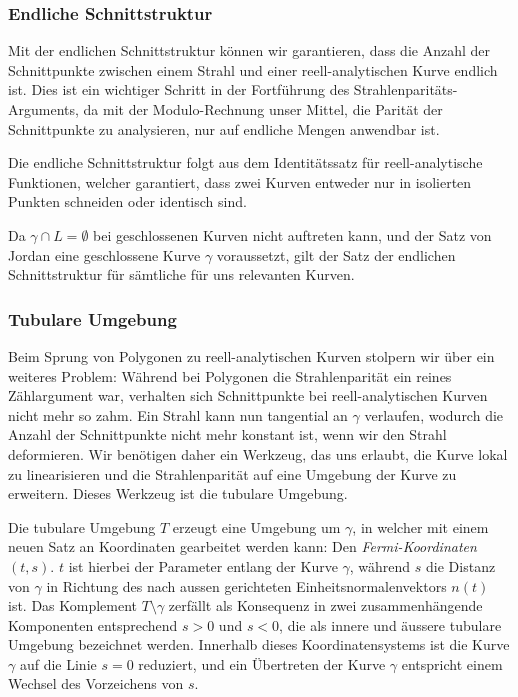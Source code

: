 \subsubsection{Endliche Schnittstruktur
\label{jordan:subsubsection:endliche_schnittstruktur}}

Mit der endlichen Schnittstruktur können wir garantieren, dass die Anzahl der Schnittpunkte zwischen einem Strahl und einer reell-analytischen Kurve endlich ist. 
Dies ist ein wichtiger Schritt in der Fortführung des Strahlenparitäts-Arguments, da mit der Modulo-Rechnung unser Mittel, die Parität der Schnittpunkte zu analysieren, nur auf endliche Mengen anwendbar ist. 



Die endliche Schnittstruktur folgt aus dem Identitätssatz für reell-analytische Funktionen, welcher garantiert, dass zwei Kurven entweder nur in isolierten Punkten schneiden oder identisch sind.



Da $\gamma \cap L = \emptyset$ bei geschlossenen Kurven nicht auftreten kann, und der Satz von Jordan eine geschlossene Kurve $\gamma$ voraussetzt, gilt der Satz der endlichen Schnittstruktur für sämtliche für uns relevanten Kurven. 

\subsubsection{Tubulare Umgebung
\label{jordan:subsubsection:tubulare_umgebung}}

Beim Sprung von Polygonen zu reell-analytischen Kurven stolpern wir über ein weiteres Problem: 
Während bei Polygonen die Strahlenparität ein reines Zählargument war, verhalten sich Schnittpunkte bei reell-analytischen Kurven nicht mehr so zahm.
Ein Strahl kann nun tangential an $\gamma$ verlaufen, wodurch die Anzahl der Schnittpunkte nicht mehr konstant ist, wenn wir den Strahl deformieren. 
Wir benötigen daher ein Werkzeug, das uns erlaubt, die Kurve lokal zu linearisieren und die Strahlenparität auf eine Umgebung der Kurve zu erweitern. 
Dieses Werkzeug ist die tubulare Umgebung.



Die tubulare Umgebung $T$ erzeugt eine Umgebung um $\gamma$, in welcher mit einem neuen Satz an Koordinaten gearbeitet werden kann: Den \emph{Fermi-Koordinaten} $(t, s)$.
%
$t$ ist hierbei der Parameter entlang der Kurve $\gamma$, während $s$ die Distanz von $\gamma$ in Richtung des nach aussen gerichteten Einheitsnormalenvektors $n(t)$ ist.
Das Komplement $T \setminus \gamma$ zerfällt als Konsequenz in zwei zusammenhängende Komponenten entsprechend $s > 0$ und $s < 0$, die als innere und äussere tubulare Umgebung bezeichnet werden.
Innerhalb dieses Koordinatensystems ist die Kurve $\gamma$ auf die Linie $s = 0$ reduziert, und ein Übertreten der Kurve $\gamma$ entspricht einem Wechsel des Vorzeichens von $s$.

